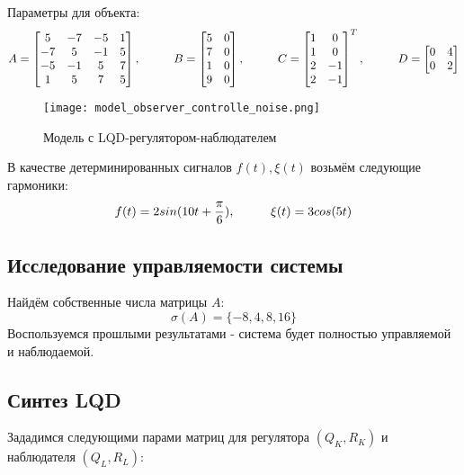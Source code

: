 Параметры для объекта:
$$
  A = \begin{bmatrix}
    5 & -7 & -5 & 1 \\
    -7 & 5 & -1 & 5 \\
    -5 & -1 & 5 & 7 \\
    1 & 5 & 7 & 5 \\
\end{bmatrix}, \hspace*{1cm}
  B = \begin{bmatrix}
    5 & 0 \\
    7 & 0 \\
    1 & 0 \\
    9 & 0 \\
\end{bmatrix}, \hspace*{1cm}
C = \begin{bmatrix}
  1 & 0 \\
  1 & 0 \\
  2 & -1 \\
  2 & -1 \\
\end{bmatrix}^T, \hspace*{1cm}
D = \begin{bmatrix}
  0 & 4 \\
  0 & 2 \\
\end{bmatrix}
$$

\begin{figure}[ht]
  \centering
  \texttt{[image: model\_observer\_controlle\_noise.png]}
  \caption{Модель с LQD-регулятором-наблюдателем}
\end{figure}

В качестве детерминированных сигналов $f(t), \xi(t)$ возьмём следующие гармоники:
$$
  f(t) = 2sin(10t + \frac{\pi}{6}) , \hspace*{1cm} \xi(t) = 3cos(5t)
$$

\subsection{Исследование управляемости системы}
Найдём собственные числа матрицы $A$:
$$
    \sigma(A) = \{-8, 4, 8, 16\}
$$
Воспользуемся прошлыми результатами - система будет полностью управляемой и наблюдаемой.

\newpage
\subsection{Синтез LQD}

Зададимся следующими парами матриц для регулятора $(Q_K, R_K)$ и наблюдателя $(Q_L, R_L)$:

